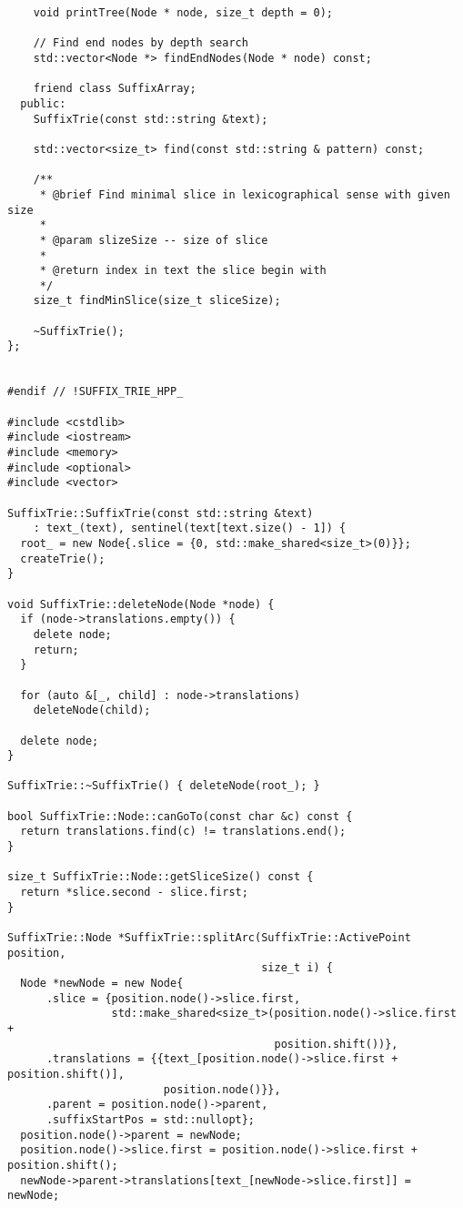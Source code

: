 \begin{verbatim}
    void printTree(Node * node, size_t depth = 0);

    // Find end nodes by depth search
    std::vector<Node *> findEndNodes(Node * node) const;

    friend class SuffixArray;
  public:
    SuffixTrie(const std::string &text);

    std::vector<size_t> find(const std::string & pattern) const;

    /**
     * @brief Find minimal slice in lexicographical sense with given size
     *
     * @param slizeSize -- size of slice
     *
     * @return index in text the slice begin with
     */
    size_t findMinSlice(size_t sliceSize);

    ~SuffixTrie();
};


#endif // !SUFFIX_TRIE_HPP_

#include <cstdlib>
#include <iostream>
#include <memory>
#include <optional>
#include <vector>

SuffixTrie::SuffixTrie(const std::string &text)
    : text_(text), sentinel(text[text.size() - 1]) {
  root_ = new Node{.slice = {0, std::make_shared<size_t>(0)}};
  createTrie();
}

void SuffixTrie::deleteNode(Node *node) {
  if (node->translations.empty()) {
    delete node;
    return;
  }

  for (auto &[_, child] : node->translations)
    deleteNode(child);

  delete node;
}

SuffixTrie::~SuffixTrie() { deleteNode(root_); }

bool SuffixTrie::Node::canGoTo(const char &c) const {
  return translations.find(c) != translations.end();
}

size_t SuffixTrie::Node::getSliceSize() const {
  return *slice.second - slice.first;
}

SuffixTrie::Node *SuffixTrie::splitArc(SuffixTrie::ActivePoint position,
                                       size_t i) {
  Node *newNode = new Node{
      .slice = {position.node()->slice.first,
                std::make_shared<size_t>(position.node()->slice.first +
                                         position.shift())},
      .translations = {{text_[position.node()->slice.first + position.shift()],
                        position.node()}},
      .parent = position.node()->parent,
      .suffixStartPos = std::nullopt};
  position.node()->parent = newNode;
  position.node()->slice.first = position.node()->slice.first + position.shift();
  newNode->parent->translations[text_[newNode->slice.first]] = newNode;


\end{verbatim}
